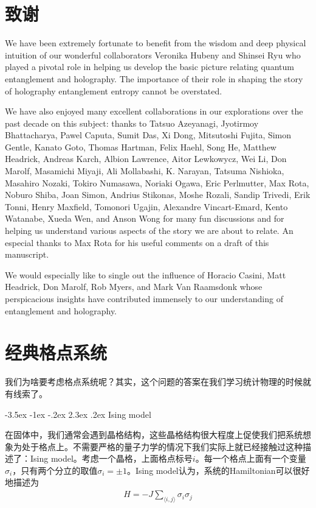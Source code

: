 \documentclass[12pt,openany]{book}
\makeatletter
\renewcommand\section{\@startsection {section}{1}{\z@}%
                                   {-3.5ex \@plus -1ex \@minus -.2ex}%
                                   {2.3ex \@plus.2ex}%
                                   {\normalfont\large\bfseries}}
\makeatother
\begin{document}

\chapter{致谢}

We have been extremely fortunate to benefit from the wisdom and deep physical intuition of our wonderful collaborators  Veronika Hubeny and Shinsei Ryu who played a pivotal role in helping us develop the basic picture relating quantum entanglement and holography. The importance of their role in shaping the story of holography entanglement entropy cannot be overstated. 

We have also enjoyed many excellent collaborations in our explorations over the past decade on this subject: thanks to Tatsuo  Azeyanagi, Jyotirmoy Bhattacharya, Pawel Caputa, Sumit Das, Xi Dong, Mitsutoshi Fujita, Simon Gentle, Kanato Goto, Thomas Hartman, Felix Haehl, Song He,  Matthew Headrick, Andreas Karch, Albion Lawrence, Aitor Lewkowycz, Wei Li, Don Marolf, Masamichi Miyaji, Ali Mollabashi, K. Narayan, Tatsuma Nishioka, Masahiro Nozaki, Tokiro  Numasawa, Noriaki  Ogawa, Eric Perlmutter, Max Rota, Noburo Shiba, Joan Simon, Andrius  Stikonas, Moshe Rozali, Sandip Trivedi, Erik Tonni, Henry Maxfield, Tomonori Ugajin, Alexandre Vincart-Emard, Kento Watanabe, Xueda Wen, and Anson Wong for many fun discussions and for helping us understand various aspects of the story we are about to relate. An especial thanks to Max Rota for his useful comments on a draft of this manuscript.

We would especially like to single out the influence of Horacio Casini, Matt Headrick, Don Marolf, Rob Myers, and Mark Van Raamsdonk whose perspicacious insights have contributed immensely to our understanding of entanglement and holography. 


\newpage 
\tableofcontents
\cleardoublepage

\mainmatter

\chapter{经典格点系统}

我们为啥要考虑格点系统呢？其实，这个问题的答案在我们学习统计物理的时候就有线索了。

\section{Ising model}

在固体中，我们通常会遇到晶格结构，这些晶格结构很大程度上促使我们把系统想象为处于格点上。不需要严格的量子力学的情况下我们实际上就已经接触过这种描述了：Ising model。考虑一个晶格，上面格点标号$i$。每一个格点上面有一个变量$\sigma_i$，只有两个分立的取值$\sigma_i=\pm1$。Ising model认为，系统的Hamiltonian可以很好地描述为
\begin{align}
H=-J\sum_{\langle i,j\rangle}\sigma_i\sigma_j
\end{align}
\end{document}
